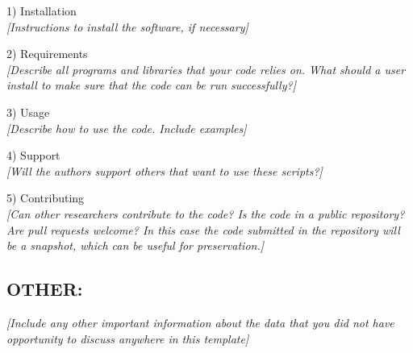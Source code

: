 \documentclass[]{article}
\begin{document}
1) Installation\\
\emph{{[}Instructions to install the software, if necessary{]}}

2) Requirements\\
\emph{{[}Describe all programs and libraries that your code relies on.
What should a user install to make sure that the code can be run
successfully?{]}}

3) Usage\\
\emph{{[}Describe how to use the code. Include examples{]}}

4) Support\\
\emph{{[}Will the authors support others that want to use these
scripts?{]}}

5) Contributing\\
\emph{{[}Can other researchers contribute to the code? Is the code in a
public repository? Are pull requests welcome? In this case the code
submitted in the repository will be a snapshot, which can be useful for
preservation.{]}}

\subsection{OTHER:}\label{other}

\emph{{[}Include any other important information about the data that you
did not have opportunity to discuss anywhere in this template{]}}
\end{document}
